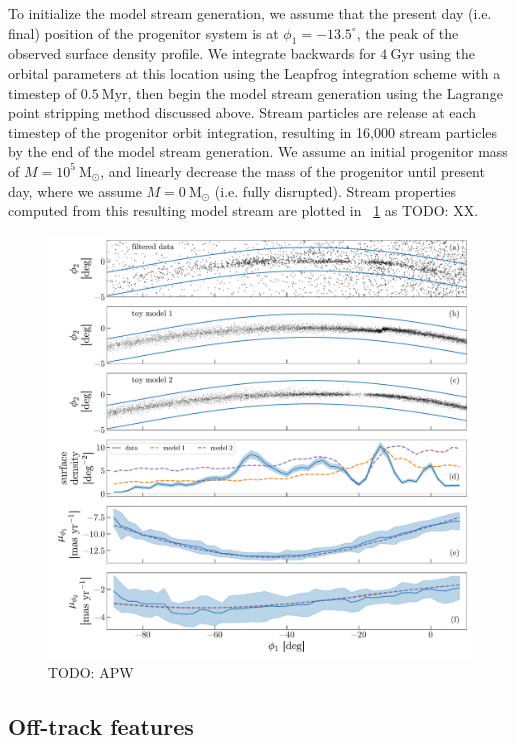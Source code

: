 \documentclass[modern]{aastex62}
\newcommand{\msun}{\textrm{M}_\odot}
\newcommand{\todo}[1]{{\color{red} TODO: #1}}
\begin{document}
To initialize the model stream generation, we assume that the present day (i.e.
final) position of the progenitor system is at $\phi_1 = -13.5^\circ$, the peak
of the observed surface density profile.
We integrate backwards for $4~\textrm{Gyr}$ using the orbital parameters at this
location using the Leapfrog integration scheme with a timestep of
$0.5~\textrm{Myr}$, then begin the model stream generation using the Lagrange
point stripping method discussed above.
Stream particles are release at each timestep of the progenitor orbit
integration, resulting in 16,000 stream particles by the end of the model stream
generation.
We assume an initial progenitor mass of $M=10^5~\msun$, and linearly decrease
the mass of the progenitor until present day, where we assume $M = 0~\msun$
(i.e. fully disrupted).
Stream properties computed from this resulting model stream are plotted in
\figurename~\ref{fig:track-and-model} as \todo{XX}.

\begin{figure}[h]
\begin{center}
\includegraphics[width=\textwidth]{track_observables.pdf}
\end{center}
\caption{%
\todo{APW}
\label{fig:track-and-model}
}
\end{figure}


\subsection{Off-track features}
\label{sec:res_gap}
\end{document}
